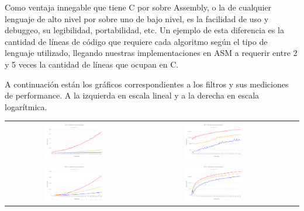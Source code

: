 Como ventaja innegable que tiene C por sobre Assembly, o la de cualquier lenguaje de alto nivel por sobre uno de bajo nivel, es la facilidad de uso y debuggeo, su legibilidad, portabilidad, etc. Un ejemplo de esta diferencia es la cantidad de líneas de código que requiere cada algoritmo según el tipo de lenguaje utilizado, llegando nuestras implementaciones en ASM a requerir entre 2 y 5 veces la cantidad de líneas que ocupan en C.

A continuación están los gráficos correspondientes a los filtros y sus mediciones de performance. A la izquierda en escala lineal y a la derecha en escala logarítmica.

\begin{center}
	\begin{tabular}{cccc}
	  \includegraphics[width=0.45\textwidth]{imagenes/testperformance/BLITperformance.png} &
	  \includegraphics[width=0.45\textwidth]{imagenes/testperformance/BLITperformanceLOG.png} \\
	  \includegraphics[width=0.45\textwidth]{imagenes/testperformance/EDGEperformanceLIN.png} &
	  \includegraphics[width=0.45\textwidth]{imagenes/testperformance/EDGEperformanceLOG.png} \\

\end{tabular}
\end{center}
